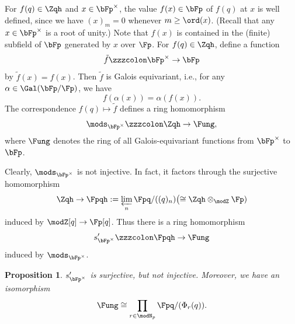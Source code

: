 \documentclass{amsart}
\numberwithin{equation}{section}
\numberwithin{figure}{section}
\theoremstyle{plain}
\newtheorem{proposition}[theorem]{Proposition}
\theoremstyle{definition}
\theoremstyle{remark}
\begin{document}
For $f(q)\in \Zqh$ and $x\in \bFp^\times $, the value $f(x)\in \bFp$ of $f(q)$ at
$x$ is well defined, since we have $(x)_m=0$ whenever $m\ge \ord(x)$.
(Recall that any $x\in \bFp^\times $ is a root of unity.)  Note that $f(x)$
is contained in the (finite) subfield of $\bFp$ generated by $x$ over
$\Fp$.  For $f(q)\in \Zqh$, define a function
\begin{equation*}
  \tilde{f}\zzzcolon \bFp^\times \rightarrow \bFp
\end{equation*}
by $\tilde{f}(x)=f(x)$.  Then $\tilde{f}$ is Galois equivariant, i.e.,
for any $\alpha \in \Gal(\bFp/\Fp)$, we have
\begin{equation*}
  f(\alpha (x))=\alpha (f(x)).
\end{equation*}
The correspondence $f(q)\mapsto \tilde{f}$ defines a ring homomorphism
\begin{equation*}
  \mods _{\bFp^\times }\zzzcolon \Zqh\rightarrow \Fung,
\end{equation*}
where $\Fung$ denotes the ring of all Galois-equivariant functions
from $\bFp^\times $ to $\bFp$.

Clearly, $\mods _{\bFp^\times }$ is not injective.  In fact, it factors
through the surjective homomorphism
\begin{equation*}
  \Zqh\rightarrow \Fpqh:=\varprojlim_{n}\Fpq/((q)_n) \bigl(\cong \Zqh\otimes _\modZ \Fp)
\end{equation*}
induced by $\modZ [q]\rightarrow \Fp[q]$.  Thus there is a ring homomorphism
\begin{equation*}
  s'_{\bFp^\times }\zzzcolon \Fpqh\rightarrow \Fung
\end{equation*}
induced by $\mods _{\bFp^\times }$.

\begin{proposition}
  \label{r35}
  $s'_{\bFp^\times }$ is surjective, but not injective.
  Moreover, we have an isomorphism
  \begin{equation}
    \label{e54}
    \Fung\cong \prod_{r\in \modN _p}\Fpq/(\Phi _r(q)).
  \end{equation}
\end{proposition}
\end{document}
